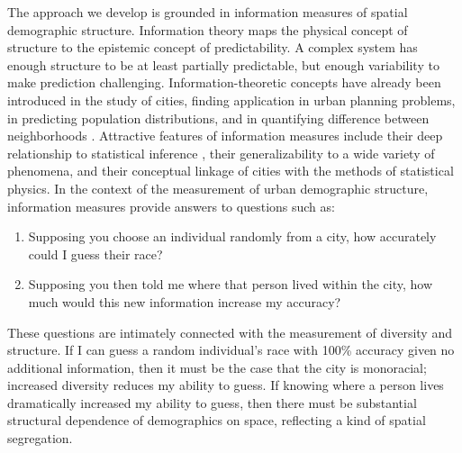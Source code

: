 	The approach we develop is grounded in information measures of spatial demographic structure. Information theory maps the physical concept of structure to the epistemic concept of predictability. A complex system has enough structure to be at least partially predictable, but enough variability to make prediction challenging. Information-theoretic concepts have already been introduced in the study of cities, finding application in urban planning problems, in predicting population distributions, and in quantifying difference between neighborhoods \cite{Royal2014,Batty1974,Batty1976,Battya,Bettencourt2015,Webber1979}. Attractive features of information measures include their deep relationship to statistical inference \cite{Cover1991,Csiszzr2004}, their generalizability to a wide variety of phenomena, and their conceptual linkage of cities with the methods of statistical physics. In the context of the measurement of urban demographic structure, information measures provide answers to questions such as: 
	\begin{enumerate}
		\item Supposing you choose an individual randomly from a city, how accurately could I guess their race? 
		\item Supposing you then told me where that person lived within the city, how much would this new information increase my accuracy? 
	\end{enumerate}
	These questions are intimately connected with the measurement of diversity and structure. If I can guess a random individual's race with 100\% accuracy given no additional information, then it must be the case that the city is monoracial; increased diversity reduces my ability to guess. If knowing where a person lives dramatically increased my ability to guess, then there must be substantial structural dependence of demographics on space, reflecting a kind of spatial segregation. 


